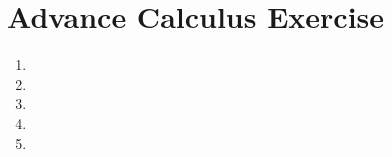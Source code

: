 


\cfoot{\thepage} %

\section*{Advance Calculus Exercise}
 
 \begin{enumerate}[wide,label = Question: ]
   \item 
   \item 
   \item 
   \item 
   \item 
   
   
   
 \end{enumerate}

